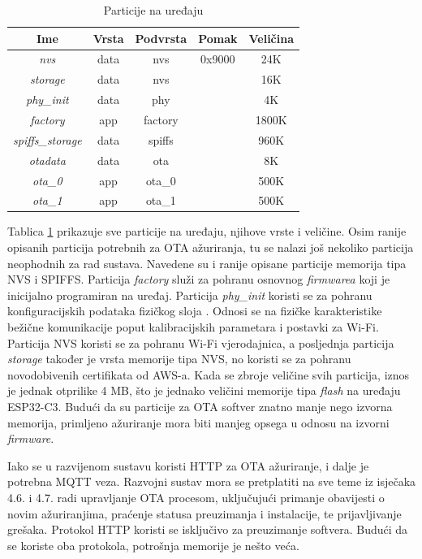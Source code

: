 \begin{table}[ht!]
	\centering
	\small
	\caption{Particije na uređaju}
	\begin{tabular}{|c| c| c| c| c|}
		\hline
		\rowcolor{lightblue}  
		\textbf{Ime} & \textbf{Vrsta} & \textbf{Podvrsta} & \textbf{Pomak} & \textbf{Veličina} \\ \hline
		\textit{nvs} & data & nvs & 0x9000 & 24K \\ \hline
		\textit{storage} & data & nvs &   & 16K \\ \hline
		\textit{phy\_init} & data & phy &   & 4K \\ \hline
		\textit{factory} & app & factory &   & 1800K \\ \hline
		\textit{spiffs\_storage} & data & spiffs &   & 960K \\ \hline
		\textit{otadata} & data & ota &   & 8K \\ \hline
		\textit{ota\_0} & app & ota\_0 &   & 500K \\ \hline
		\textit{ota\_1} & app & ota\_1 &   & 500K \\ \hline
	\end{tabular}
	\label{table:partitions}
\end{table}

Tablica \ref{table:partitions} prikazuje sve particije na uređaju, njihove vrste i veličine. Osim ranije opisanih particija potrebnih za OTA ažuriranja, tu se nalazi još nekoliko particija neophodnih za rad sustava. Navedene su i ranije opisane particije memorija tipa NVS i SPIFFS. Particija \textit{factory} služi za pohranu osnovnog \textit{firmwarea} koji je inicijalno programiran na uređaj. Particija \textit{phy\_init} koristi se za pohranu konfiguracijskih podataka fizičkog sloja . Odnosi se na fizičke karakteristike bežične komunikacije poput kalibracijskih parametara i postavki za Wi-Fi. Particija NVS koristi se za pohranu Wi-Fi vjerodajnica, a posljednja particija \textit{storage} također je vrsta memorije tipa NVS, no koristi se za pohranu novodobivenih certifikata od AWS-a. Kada se zbroje veličine svih particija, iznos je jednak otprilike 4 MB, što je jednako veličini memorije tipa \textit{flash} na uređaju ESP32-C3. Budući da su particije za OTA softver znatno manje nego izvorna memorija, primljeno ažuriranje mora biti manjeg opsega u odnosu na izvorni \textit{firmware}.

Iako se u razvijenom sustavu koristi HTTP za OTA ažuriranje, i dalje je potrebna MQTT veza. Razvojni sustav mora se pretplatiti na sve teme iz isječaka 4.6. i 4.7. radi  upravljanje OTA procesom, uključujući primanje obavijesti o novim ažuriranjima, praćenje statusa preuzimanja i instalacije, te prijavljivanje grešaka. Protokol HTTP koristi se isključivo za preuzimanje softvera. Budući da se koriste oba protokola, potrošnja memorije je nešto veća.

